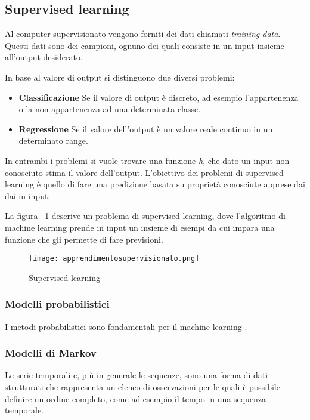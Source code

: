 \documentclass[../main.tex]{subfiles}
\begin{document}
\subsection{Supervised learning}
Al computer supervisionato vengono forniti dei dati chiamati \textit{training data}. Questi dati sono dei campioni, ognuno dei quali consiste in un input insieme all'output desiderato.

In base al valore di output si distinguono due diversi problemi:

\begin{itemize}
				\item \textbf{Classificazione} Se il valore di output è discreto, ad esempio l'appartenenza o la non appartenenza ad una determinata classe.
				\item \textbf{Regressione} Se il valore dell'output è un valore reale continuo in un determinato range.
\end{itemize}

In entrambi i problemi si vuole trovare una funzione \textit{h}, che dato un input non conosciuto stima il valore dell'output. L'obiettivo dei problemi di supervised learning è quello di fare una predizione basata su proprietà conosciute apprese dai dai in input.

La figura ~\ref{fig:supervisedLearning} descrive un problema di supervised learning, dove l'algoritmo di machine learning prende in input un insieme di esempi da cui impara una funzione che gli permette di fare previsioni.

\begin{figure}[H]
				\centering
				\texttt{[image: apprendimentosupervisionato.png]}
				\caption{Supervised learning}
				\label{fig:supervisedLearning}
\end{figure}

\subsubsection{Modelli probabilistici}
I metodi probabilistici sono fondamentali per il machine learning \cite{compIntelligence}.

\subsubsection{Modelli di Markov}
Le serie temporali e, più in generale le sequenze, sono una forma di dati strutturati che rappresenta un elenco di osservazioni per le quali è possibile definire un ordine completo, come ad esempio il tempo in una sequenza temporale.
\end{document}
